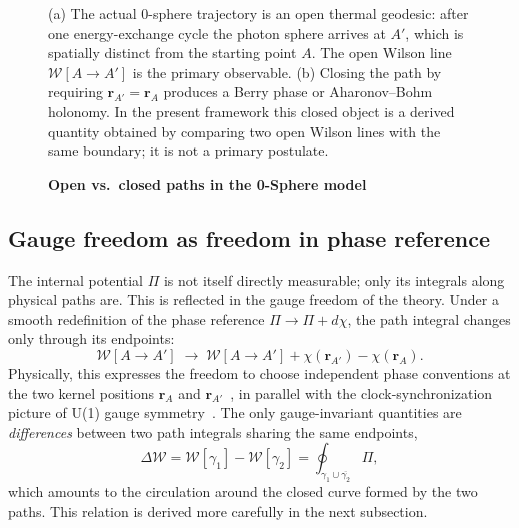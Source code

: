 \documentclass[%
 reprint, amsmath,amssymb, aps, prb, ]{revtex4-2}
\numberwithin{equation}{section}
\newcommand{\WL}{\mathcal{W}}
\begin{document}
\begin{figure}[t]
\centering

\caption{\textbf{Open vs.\ closed paths in the 0-Sphere model}}
\label{fig:paths}
\vspace{0.4em}
\begin{minipage}{0.95\textwidth}
\justifying\small
(a) The actual 0-sphere trajectory is an open thermal geodesic: after one energy-exchange cycle the photon sphere arrives at $A'$, which is spatially distinct from the starting point $A$. The open Wilson line $\WL[A\to A']$ is the primary observable. (b) Closing the path by requiring $\mathbf{r}_{A'}=\mathbf{r}_A$ produces a Berry phase or Aharonov--Bohm holonomy. In the present framework this closed object is a derived quantity obtained by comparing two open Wilson lines with the same boundary; it is not a primary postulate.
\end{minipage}
\end{figure}

\subsection{Gauge freedom as freedom in phase reference}

The internal potential $\Pi$ is not itself directly measurable; only its integrals along physical paths are. This is reflected in the gauge freedom of the theory. Under a smooth redefinition of the phase reference $\Pi \to \Pi + d\chi$, the path integral changes only through its endpoints:
\begin{equation}
\WL[A\to A'] \;\to\; \WL[A\to A'] + \chi(\mathbf{r}_{A'}) - \chi(\mathbf{r}_A).
\label{eq:gauge_WL}
\end{equation}
Physically, this expresses the freedom to choose independent phase conventions at the two kernel positions $\mathbf{r}_A$ and $\mathbf{r}_{A'}$~\cite{hanamura17}, in parallel with the clock-synchronization picture of U(1) gauge symmetry~\cite{WuYang1975}. The only gauge-invariant quantities are \emph{differences} between two path integrals sharing the same endpoints,
\begin{equation}
\Delta\WL = \WL[\gamma_1] - \WL[\gamma_2]
= \oint_{\gamma_1\cup\overline{\gamma_2}} \Pi,
\label{eq:DeltaWL}
\end{equation}
which amounts to the circulation around the closed curve formed by the two paths. This relation is derived more carefully in the next subsection.
\end{document}
